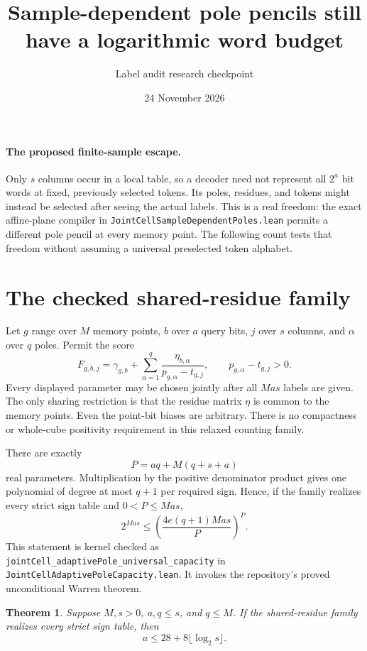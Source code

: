 \documentclass[11pt]{article}
\title{Sample-dependent pole pencils still have a logarithmic word budget}
\date{24 November 2026}
\author{Label audit research checkpoint}
\newtheorem{theorem}{Theorem}
\begin{document}
\maketitle

\paragraph{The proposed finite-sample escape.}
Only $s$ columns occur in a local table, so a decoder need not represent
all $2^a$ bit words at fixed, previously selected tokens. Its poles,
residues, and tokens might instead be selected after seeing the actual
labels. This is a real freedom: the exact affine-plane compiler in
\texttt{JointCellSampleDependentPoles.lean} permits a different pole
pencil at every memory point. The following count tests that freedom
without assuming a universal preselected token alphabet.

\section{The checked shared-residue family}

Let $g$ range over $M$ memory points, $b$ over $a$ query bits, $j$ over
$s$ columns, and $\alpha$ over $q$ poles. Permit the score
\[
 F_{g,b,j}=\gamma_{g,b}
    +\sum_{\alpha=1}^{q}\frac{\eta_{b,\alpha}}
                                    {p_{g,\alpha}-t_{g,j}},
 \qquad p_{g,\alpha}-t_{g,j}>0.
\]
Every displayed parameter may be chosen jointly after all $Mas$ labels
are given. The only sharing restriction is that the residue matrix
$\eta$ is common to the memory points. Even the point-bit biases are
arbitrary. There is no compactness or whole-cube positivity requirement
in this relaxed counting family.

There are exactly
\[
 P=aq+M(q+s+a)
\]
real parameters. Multiplication by the positive denominator product
gives one polynomial of degree at most $q+1$ per required sign. Hence,
if the family realizes every strict sign table and $0<P\leq Mas$,
\[
 2^{Mas}\leq
 \left(\frac{4e(q+1)Mas}{P}\right)^P.
\]
This statement is kernel checked as
\texttt{jointCell\_adaptivePole\_universal\_capacity} in
\texttt{JointCellAdaptivePoleCapacity.lean}. It invokes the repository's
proved unconditional Warren theorem.

\begin{theorem}
Suppose $M,s>0$, $a,q\leq s$, and $q\leq M$. If the shared-residue
family realizes every strict sign table, then
\[
 a\leq28+8\lfloor\log_2s\rfloor.
\]
\end{theorem}
\end{document}
